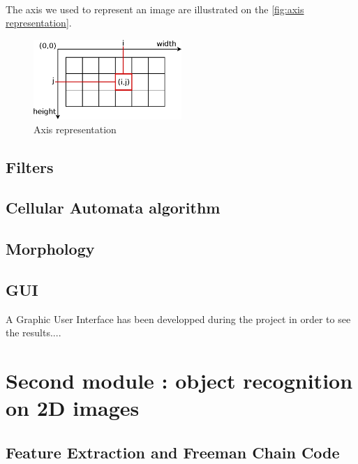 
~~

The axis we used to represent an image are illustrated on the \vref{fig:axis representation}. 

\begin{figure}[h]
	\centering
	\includegraphics[width=0.5\textwidth]{images/axis/axis_representation}
	\caption{Axis representation}
	\label{fig:axis representation}
\end{figure}






\subsection{Filters}

\subsection{Cellular Automata algorithm}

\subsection{Morphology}



\subsection{GUI}

A Graphic User Interface has been developped during the project in order to see the results.... 








\section{Second module : object recognition on 2D images}



\subsection{Feature Extraction and Freeman Chain Code}


